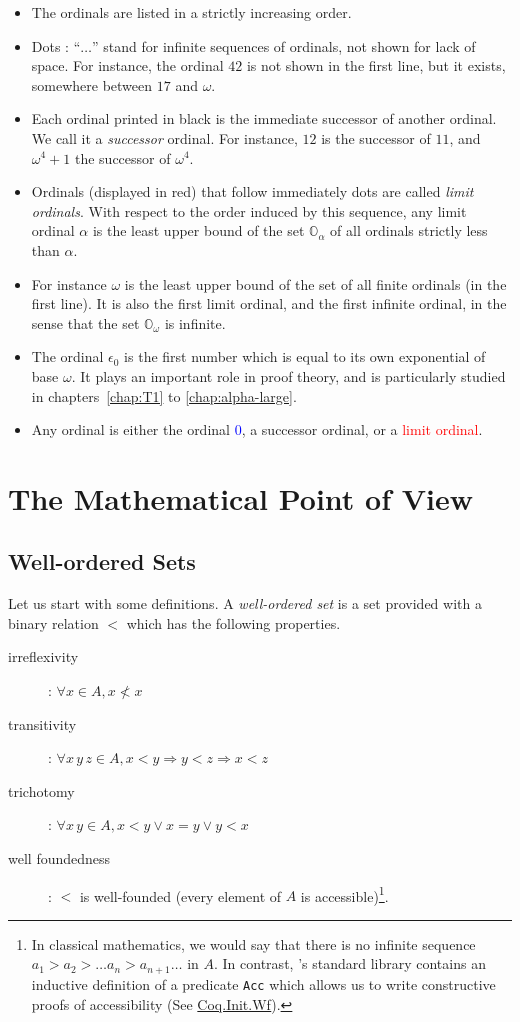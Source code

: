 \begin{itemize}
\item The ordinals are listed in a strictly increasing order. 
\item Dots : ``$\ldots$'' stand for  infinite sequences of ordinals, not shown for lack of space. For instance, the ordinal $42$ is not shown in the first line, but it exists, somewhere between $17$ and $\omega$.
\item Each ordinal printed in black is the immediate successor of another ordinal. We call it a \emph{successor} ordinal. For instance, $12$ is the successor of $11$, and $\omega^4+1$ the successor of $\omega^4$.
\item Ordinals (displayed in red)  that  follow immediately dots are called \emph{limit ordinals}. With respect to the order induced by this sequence, any limit ordinal $\alpha$ is the least upper bound of  the set $\mathbb{O}_\alpha$ of all ordinals strictly less than $\alpha$.
\item
For instance $\omega$ is the least upper bound of the set of all finite ordinals (in the first line). It is also the first limit ordinal, and the first infinite ordinal, in the sense that 
the set $\mathbb{O}_\omega$ is infinite.
\item The ordinal $\epsilon_0$ is the first number which is equal to its own exponential of base $\omega$. It plays an important role in proof theory, and is particularly studied in chapters~\ref{chap:T1} to \ref{chap:alpha-large}.
\item Any ordinal is  either the ordinal \textcolor{blue}{$0$},
a successor ordinal, or a \textcolor{red}{limit ordinal}.
\end{itemize}




\section{The Mathematical Point of View}

\subsection{Well-ordered Sets}
Let us start with some definitions.
A  \emph{well-ordered set} is a set provided with a binary relation $<$ which has the following properties.
\begin{description}
\item[irreflexivity] : $\forall x\in A, x\not< x$
\item[transitivity] : $\forall x\,y\,z\in A, x<y \Rightarrow y<z \Rightarrow x<z$
\item[trichotomy]: $\forall x\,y\in A, x<y \vee x = y \vee y < x$
\item[well foundedness]: $<$ is well-founded (every element of $A$ is accessible)\footnote{In classical mathematics, we would say that there is no infinite sequence $a_1>a_2> \dots a_n> a_{n+1}\dots$ in $A$. In contrast, \coq's standard library contains
an inductive definition of a predicate \texttt{Acc} which allows us to write 
constructive proofs of accessibility (See \href{https://coq.inria.fr/distrib/current/stdlib/Coq.Init.Wf.html}{Coq.Init.Wf}).}.
\end{description}

